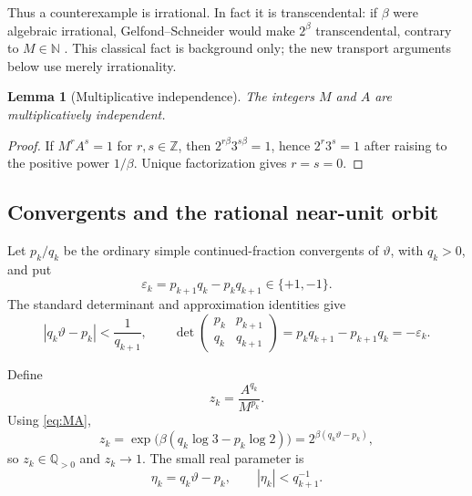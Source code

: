 \documentclass[11pt,oneside]{article}
\newtheorem{lemma}[theorem]{Lemma}
\theoremstyle{definition}
\theoremstyle{remark}
\newcommand{\N}{\mathbb N}
\newcommand{\Z}{\mathbb Z}
\newcommand{\Q}{\mathbb Q}
\newcommand{\thetaq}{\vartheta}
\newcommand{\eps}{\varepsilon}
\begin{document}
Thus a counterexample is irrational.  In fact it is transcendental: if $\beta$ were algebraic
irrational, Gelfond--Schneider would make $2^\beta$ transcendental, contrary to
$M\in\N$ \cite{Baker1975,LangTranscendental}.  This classical fact is background only; the
new transport arguments below use merely irrationality.

\begin{lemma}[Multiplicative independence]
\label{lem:MA-independent}
The integers $M$ and $A$ are multiplicatively independent.
\end{lemma}

\begin{proof}
If $M^rA^s=1$ for $r,s\in\Z$, then
$2^{r\beta}3^{s\beta}=1$, hence $2^r3^s=1$ after raising to the positive power $1/\beta$.
Unique factorization gives $r=s=0$.
\end{proof}

\subsection{Convergents and the rational near-unit orbit}

Let $p_k/q_k$ be the ordinary simple continued-fraction convergents of $\thetaq$, with
$q_k>0$, and put
\begin{equation}
 \eps_k=p_{k+1}q_k-p_kq_{k+1}\in\{+1,-1\}.
 \label{eq:epsilon}
\end{equation}
The standard determinant and approximation identities give
\begin{equation}
 |q_k\thetaq-p_k|<\frac1{q_{k+1}},
 \qquad
 \det\begin{pmatrix}p_k&p_{k+1}\\q_k&q_{k+1}\end{pmatrix}
 =p_kq_{k+1}-p_{k+1}q_k=-\eps_k.
 \label{eq:cf-basic}
\end{equation}

Define
\begin{equation}
 z_k=\frac{A^{q_k}}{M^{p_k}}.
 \label{eq:zk}
\end{equation}
Using \eqref{eq:MA},
\begin{equation}
 z_k
 =\exp\!\bigl(\beta(q_k\log3-p_k\log2)\bigr)
 =2^{\beta(q_k\thetaq-p_k)},
 \label{eq:zk-near}
\end{equation}
so $z_k\in\Q_{>0}$ and $z_k\to1$.  The small real parameter is
\begin{equation}
 \eta_k=q_k\thetaq-p_k,
 \qquad |\eta_k|<q_{k+1}^{-1}.
 \label{eq:eta}
\end{equation}
\end{document}
